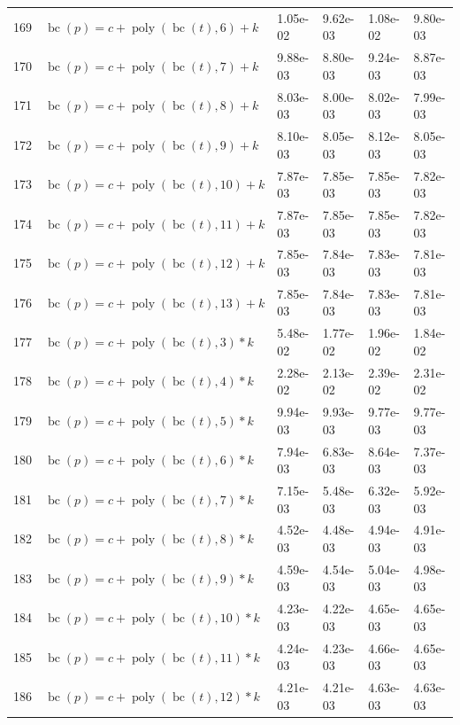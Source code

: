 \documentclass[12pt,a4paper]{article}
\DeclareMathOperator{\bc}{bc}
\DeclareMathOperator{\poly}{poly}
\begin{document}
\begin{longtable}[t]{ll>{\raggedleft\arraybackslash}p{2cm}>{\raggedleft\arraybackslash}p{2cm}>{\raggedleft\arraybackslash}p{2cm}>{\raggedleft\arraybackslash}p{2cm}}
\rowcolor{gray!6}  169 & $\bc(p) = c + \poly\left( \bc(t), 6 \right) + k$ & 1.05e-02 & 9.62e-03 & 1.08e-02 & 9.80e-03\\
170 & $\bc(p) = c + \poly\left( \bc(t), 7 \right) + k$ & 9.88e-03 & 8.80e-03 & 9.24e-03 & 8.87e-03\\
\rowcolor{gray!6}  171 & $\bc(p) = c + \poly\left( \bc(t), 8 \right) + k$ & 8.03e-03 & 8.00e-03 & 8.02e-03 & 7.99e-03\\
172 & $\bc(p) = c + \poly\left( \bc(t), 9 \right) + k$ & 8.10e-03 & 8.05e-03 & 8.12e-03 & 8.05e-03\\
\rowcolor{gray!6}  173 & $\bc(p) = c + \poly\left( \bc(t), 10 \right) + k$ & 7.87e-03 & 7.85e-03 & 7.85e-03 & 7.82e-03\\
174 & $\bc(p) = c + \poly\left( \bc(t), 11 \right) + k$ & 7.87e-03 & 7.85e-03 & 7.85e-03 & 7.82e-03\\
\rowcolor{gray!6}  175 & $\bc(p) = c + \poly\left( \bc(t), 12 \right) + k$ & 7.85e-03 & 7.84e-03 & 7.83e-03 & 7.81e-03\\
176 & $\bc(p) = c + \poly\left( \bc(t), 13 \right) + k$ & 7.85e-03 & 7.84e-03 & 7.83e-03 & 7.81e-03\\
\rowcolor{gray!6}  177 & $\bc(p) = c + \poly\left( \bc(t), 3 \right) * k$ & 5.48e-02 & 1.77e-02 & 1.96e-02 & 1.84e-02\\
178 & $\bc(p) = c + \poly\left( \bc(t), 4 \right) * k$ & 2.28e-02 & 2.13e-02 & 2.39e-02 & 2.31e-02\\
\rowcolor{gray!6}  179 & $\bc(p) = c + \poly\left( \bc(t), 5 \right) * k$ & 9.94e-03 & 9.93e-03 & 9.77e-03 & 9.77e-03\\
180 & $\bc(p) = c + \poly\left( \bc(t), 6 \right) * k$ & 7.94e-03 & 6.83e-03 & 8.64e-03 & 7.37e-03\\
\rowcolor{gray!6}  181 & $\bc(p) = c + \poly\left( \bc(t), 7 \right) * k$ & 7.15e-03 & 5.48e-03 & 6.32e-03 & 5.92e-03\\
182 & $\bc(p) = c + \poly\left( \bc(t), 8 \right) * k$ & 4.52e-03 & 4.48e-03 & 4.94e-03 & 4.91e-03\\
\rowcolor{gray!6}  183 & $\bc(p) = c + \poly\left( \bc(t), 9 \right) * k$ & 4.59e-03 & 4.54e-03 & 5.04e-03 & 4.98e-03\\
184 & $\bc(p) = c + \poly\left( \bc(t), 10 \right) * k$ & 4.23e-03 & 4.22e-03 & 4.65e-03 & 4.65e-03\\
\rowcolor{gray!6}  185 & $\bc(p) = c + \poly\left( \bc(t), 11 \right) * k$ & 4.24e-03 & 4.23e-03 & 4.66e-03 & 4.65e-03\\
186 & $\bc(p) = c + \poly\left( \bc(t), 12 \right) * k$ & 4.21e-03 & 4.21e-03 & 4.63e-03 & 4.63e-03\\

\end{longtable}
\end{document}

